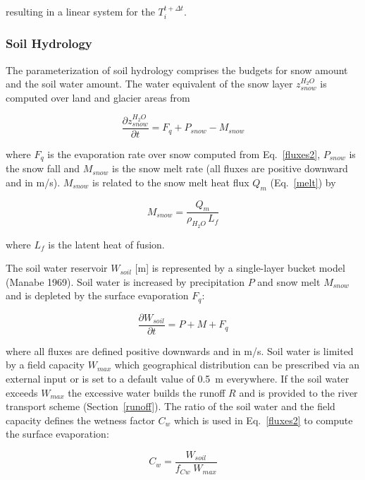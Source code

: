 resulting in a linear system for the $T_i^{t+\Delta
t}$.
                          
\subsubsection{Soil Hydrology}\label{hydro}

The parameterization of soil hydrology comprises the
budgets for snow amount and the soil
water amount. The water equivalent of the snow layer
$z_{snow}^{H_2O}$ is computed over
land and glacier areas from

\begin{equation}
\frac{\partial z_{snow}^{H_2O}}{\partial t} = F_q +
P_{snow}-M_{snow}
\end{equation}

where $F_q$ is the evaporation rate over snow
computed from Eq.~\ref{fluxes2}, $P_{snow}$ is the
snow fall and $M_{snow}$ is the snow
melt rate (all fluxes are positive downward and in m/s).
$M_{snow}$ is related to the snow melt
heat flux $Q_m$ (Eq.~\ref{melt}) by

\begin{equation}
M_{snow}=\frac{Q_m}{\rho_{H_2O}\, L_f}
\end{equation}

where $L_f$ is the latent heat of fusion.

The soil water reservoir $W_{soil}$ [m]  is
represented by a single-layer bucket model
(Manabe 1969). Soil water is increased by precipitation
$P$ and snow melt $M_{snow}$ 
and is depleted by the surface evaporation $F_q$:
 
\begin{equation}
\frac{\partial W_{soil}}{\partial t} = P + M + F_q
\end{equation}

where all fluxes are defined positive downwards and in
m/s.
Soil water is limited by a  field capacity $W_{max}$ 
which geographical distribution can be prescribed via an external input or is set to a default
value of
0.5~m everywhere. If the soil water
exceeds  $W_{max}$ the excessive
water builds the runoff $R$ and is provided to the river
transport scheme
(Section~\ref{runoff}). The ratio of the soil water and
the field capacity defines the wetness
factor $C_w$ which is used in Eq.~\ref{fluxes2} to
compute the surface evaporation:

\begin{equation}\label{cwgl}
C_w=\frac{W_{soil}}{f_{Cw} \; W_{max}}
\end{equation}

